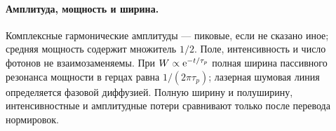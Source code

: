 \paragraph{Амплитуда, мощность и ширина.}
Комплексные гармонические амплитуды — пиковые, если не сказано иное; средняя мощность содержит множитель $1/2$. Поле, интенсивность и число фотонов не взаимозаменяемы. При $W\propto\mathrm{e}^{-t/\tau_p}$ полная ширина пассивного резонанса мощности в герцах равна $1/(2\pi\tau_p)$; лазерная шумовая линия определяется фазовой диффузией. Полную ширину и полуширину, интенсивностные и амплитудные потери сравнивают только после перевода нормировок.

